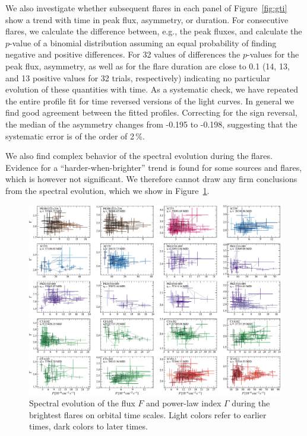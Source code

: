 \documentclass[twocolumn,linenumbers]{aastex62}
\begin{document}
We also investigate whether subsequent flares in each panel of Figure~\ref{fig:gti} show a trend with time in peak flux, asymmetry, or duration. 
For consecutive flares, we calculate the difference between, e.g., the peak fluxes, and calculate the $p$-value of a binomial distribution assuming an equal probability of finding negative and positive differences.
For 32 values of differences the $p$-values for the peak flux, asymmetry, as well as for the flare duration are close to 0.1 (14, 13, and 13 positive values for 32 trials, respectively) indicating no particular evolution of these quantities with time. 
As a systematic check, we have repeated the entire profile fit for time reversed versions of the light curves. In general we find good agreement between the fitted profiles. Correcting for the sign reversal, the median of the asymmetry changes from -0.195 to -0.198, suggesting that the systematic error is of the order of 2\,\%. 

We also find complex behavior of the spectral evolution during the flares. Evidence for a  ``harder-when-brighter'' trend is found for some sources and flares, which is however not significant. 
We therefore cannot draw any firm conclusions from the spectral evolution, which we show 
in Figure~\ref{fig:specvar}. 

\begin{figure}
    \centering
    \includegraphics[width = .9 \linewidth]{figures/lc_specvar_flare_int.pdf}
    \caption{Spectral evolution of the flux $F$ and power-law index $\Gamma$ during the brightest flares on orbital time scales. Light colors refer to earlier times, dark colors to later times.}
    \label{fig:specvar}
\end{figure}
\end{document}

